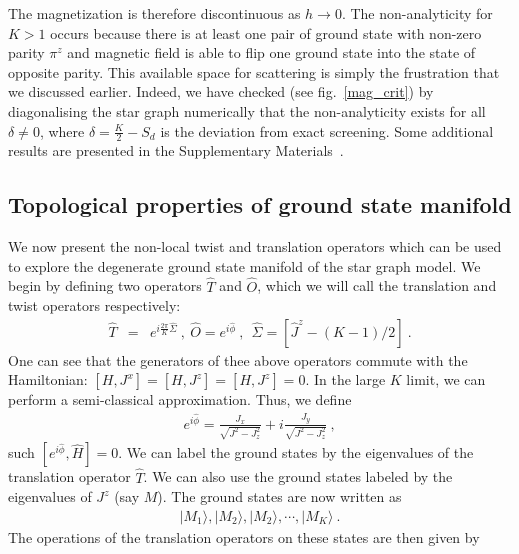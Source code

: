 \documentclass[reprint,prb,superscriptaddress]{revtex4-2}
\begin{document}
The magnetization is therefore discontinuous as \(h\to 0\). The non-analyticity for \(K>1\) occurs because there is at least one pair of ground state with non-zero parity \(\pi^z\) and magnetic field is able to flip one ground state into the state of opposite parity. This available space for scattering is simply the frustration that we discussed earlier. Indeed, we have checked (see fig.~\ref{mag_crit}) {\color{blue} by diagonalising the star graph numerically} that the non-analyticity exists for all \(\delta \neq 0\), where \(\delta = \frac{K}{2} - S_{d}\) is the deviation from exact screening. 
Some additional results are presented in the Supplementary Materials~\cite{SM}.
\subsection{Topological properties of ground state manifold}
\label{sec:topo_ground_state}
We now present the non-local twist and translation operators which can be used to explore the degenerate ground state manifold of the star graph model.
We begin by defining two operators $\hat{T}$ and $\hat{O}$, which we will call the translation and twist operators respectively: 
\begin{eqnarray}
\hat{T} &=& e^{i\frac{2\pi}{K} \hat{\Sigma}} ~,~\hat{O} = e^{i\hat{\phi}}~,~~\hat{\Sigma}=[\hat{J}^z-(K-1)/2]~.
\end{eqnarray}
One can see that the generators of thee above operators commute with the Hamiltonian: $[H,J^x]=[H,J^z]=[H,J^z]=0$. In the large \(K\) limit, we can perform a semi-classical approximation. 
Thus, we define
\begin{eqnarray}
e^{i\hat{\phi}} = \frac{J_{x}}{\sqrt{J^{2} - J_{z}^{2}}} + i\frac{J_{y}}{\sqrt{J^{2} - J_{z}^{2}}}~,
\end{eqnarray}
such $[e^{i\hat{\phi}},\hat{H}]=0$. We can label the ground states by the eigenvalues of the translation operator $\hat{T}$. We can also use the ground states labeled by the eigenvalues of $J^z$ (say $M$). The ground states are now written as 
\begin{eqnarray}
|M_1\rangle,|M_2\rangle,|M_2\rangle,\cdots ,|M_K\rangle~.
\end{eqnarray}
The operations of the translation operators on these states are then given by
\end{document}
